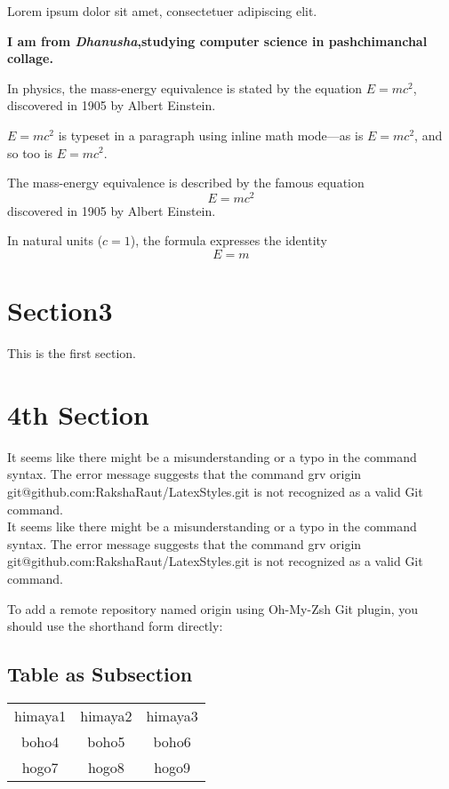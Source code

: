 \documentclass[12pt, letterpaper, twoside]{article}
\begin{document}
Lorem ipsum dolor sit amet, consectetuer adipiscing elit.  



  \textbf{I am from  \emph{Dhanusha},studying computer science in pashchimanchal collage.}

In physics, the mass-energy equivalence is stated 
by the equation $E=mc^2$, discovered in 1905 by Albert Einstein.

\begin{math}
E=mc^2
\end{math} is typeset in a paragraph using inline math mode---as is $E=mc^2$, and so too is \(E=mc^2\).

The mass-energy equivalence is described by the famous equation
\[ E=mc^2 \] discovered in 1905 by Albert Einstein. 

In natural units ($c = 1$), the formula expresses the identity
\begin{equation}
E=m
\end{equation}


\section{Section3}

This is the first section.

\section{4th Section}

It seems like there might be a misunderstanding or a typo in the command syntax. The error message suggests that the command grv origin git@github.com:RakshaRaut/LatexStyles.git is not recognized as a valid Git command.\\It seems like there might be a misunderstanding or a typo in the command syntax. The error message suggests that the command grv origin git@github.com:RakshaRaut/LatexStyles.git is not recognized as a valid Git command.

To add a remote repository named origin using Oh-My-Zsh Git plugin, you should use the shorthand form directly:

\subsection{Table as Subsection}

\begin{center}
\begin{tabular}{|c|c|c|} 
 \hline
 himaya1 & himaya2 & himaya3 \\ 
 boho4 & boho5 & boho6 \\ 
 hogo7 & hogo8 & hogo9 \\ 
 \hline
\end{tabular}
\end{center}
\end{document}
